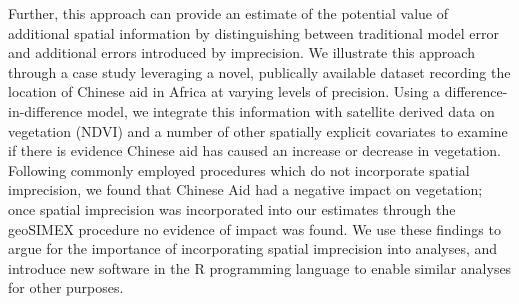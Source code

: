 Further, this approach can provide an estimate of the potential value of additional spatial information by distinguishing between traditional model error and additional errors introduced by imprecision.
We illustrate this approach through a case study leveraging a novel, publically available dataset recording the location of Chinese aid in Africa at varying levels of precision.
Using a difference-in-difference model, we integrate this information with satellite derived data on vegetation (NDVI) and a number of other spatially explicit covariates to examine if there is evidence Chinese aid has caused an increase or decrease in vegetation.
Following commonly employed procedures which do not incorporate spatial imprecision, we found that Chinese Aid had a negative impact on vegetation; once spatial imprecision was incorporated into our estimates through the geoSIMEX procedure no evidence of impact was found.
We use these findings to argue for the importance of incorporating spatial imprecision into analyses, and introduce new software in the R programming language to enable similar analyses for other purposes.
\newpage

